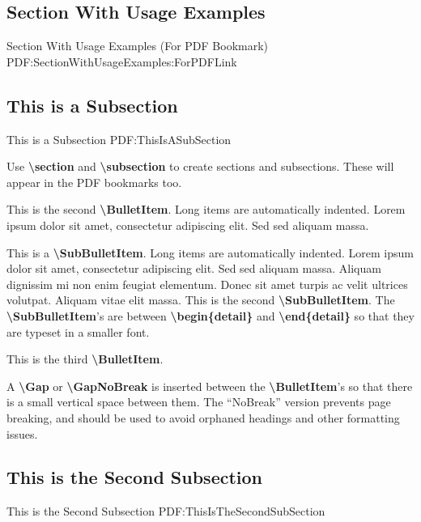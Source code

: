 \documentclass[letterpaper,MMMyyyy,nonstop]{simpleresumecv}
\newcommand{\CodeCommand}[1]{\mbox{\textbf{\textbackslash{#1}}}}
\begin{document}
\begin{body}
\iffalse

\section
{Section\newline
With\newline
Usage\newline
Examples}
{Section With Usage Examples (For PDF Bookmark)}
{PDF:SectionWithUsageExamples:ForPDFLink}

\subsection
{This is a Subsection}
{This is a Subsection}
{PDF:ThisIsASubSection}

\GapNoBreak
\BulletItem
Use \CodeCommand{section} and \CodeCommand{subsection} to create sections and subsections.
These will appear in the PDF bookmarks too.

\GapNoBreak
\BulletItem
This is the second \CodeCommand{BulletItem}.
Long items are automatically indented.
Lorem ipsum dolor sit amet, consectetur adipiscing elit.
Sed sed aliquam massa.
\begin{detail}
\SubBulletItem
This is a \CodeCommand{SubBulletItem}.
Long items are automatically indented.
Lorem ipsum dolor sit amet, consectetur adipiscing elit.
Sed sed aliquam massa.
Aliquam dignissim mi non enim feugiat elementum.
Donec sit amet turpis ac velit ultrices volutpat.
Aliquam vitae elit massa.
\SubBulletItem
This is the second \CodeCommand{SubBulletItem}.
\SubBulletItem
The \CodeCommand{SubBulletItem}'s are between
\CodeCommand{begin\{detail\}} and
\CodeCommand{end\{detail\}} so that they are typeset in a smaller font.
\end{detail}

\Gap
\BulletItem
This is the third \CodeCommand{BulletItem}.

\Gap
\BulletItem
A \CodeCommand{Gap} or \CodeCommand{GapNoBreak} is inserted between the \CodeCommand{BulletItem}'s so that there is a small vertical space between them.
The ``NoBreak'' version prevents page breaking, and should be used to avoid orphaned headings and other formatting issues.

\BigGap
\subsection
{This is the Second Subsection}
{This is the Second Subsection}
{PDF:ThisIsTheSecondSubSection}


\end{body}
\end{document}

